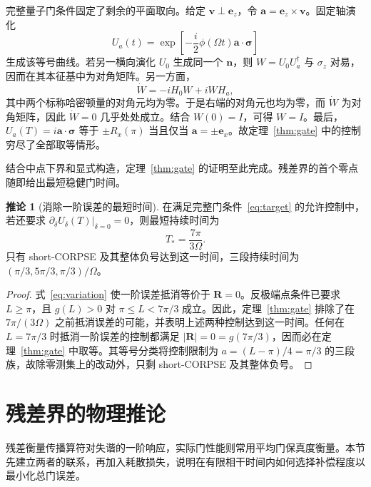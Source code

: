 \documentclass[12pt]{iopjournal}
\theoremstyle{definition}
\newtheorem{corollary}{推论}
\newcommand{\nvec}{\mathbf n}
\newcommand{\Rvec}{\mathbf R}
\newcommand{\vvec}{\mathbf v}
\newcommand{\ez}{\mathbf e_z}
\newcommand{\sigmavec}{\boldsymbol\sigma}
\begin{document}
完整量子门条件固定了剩余的平面取向。给定 $\vvec\perp\ez$，令 $\mathbf a=\ez\times\vvec$。固定轴演化
\begin{equation*}
 U_a(t)=\exp\left[-\frac{i}{2}\phi(\Omega t)
                  \mathbf a\cdot\sigmavec\right]
\end{equation*}
生成该等号曲线。若另一横向演化 $U_0$ 生成同一个 $\nvec$，则 $W=U_0U_a^\dagger$ 与 $\sigma_z$ 对易，因而在其本征基中为对角矩阵。另一方面，
\begin{equation}
 \dot W=-iH_0W+iWH_a,
 \label{eq:lift-uniqueness}
\end{equation}
其中两个标称哈密顿量的对角元均为零。于是右端的对角元也均为零，而 $\dot W$ 为对角矩阵，因此 $\dot W=0$ 几乎处处成立。结合 $W(0)=I$，可得 $W=I$。最后，$U_a(T)=i\mathbf a\cdot\sigmavec$ 等于 $\pm R_x(\pi)$ 当且仅当 $\mathbf a=\pm\mathbf e_x$。故定理~\ref{thm:gate} 中的控制穷尽了全部取等情形。

结合中点下界和显式构造，定理~\ref{thm:gate} 的证明至此完成。残差界的首个零点随即给出最短稳健门时间。

\begin{corollary}[消除一阶误差的最短时间]
\label{cor:robust-time}
在满足完整门条件~\eqref{eq:target} 的允许控制中，若还要求 $\left.\partial_\delta U_\delta(T)\right|_{\delta=0}=0$，则最短持续时间为
\begin{equation}
 T_* = \frac{7\pi}{3\Omega}.
 \label{eq:robust-time}
\end{equation}
只有 short-CORPSE 及其整体负号达到这一时间，三段持续时间为 $(\pi/3,5\pi/3,\pi/3)/\Omega$。
\end{corollary}

\begin{proof}
式~\eqref{eq:variation} 使一阶误差抵消等价于 $\Rvec=0$。反极端点条件已要求 $L\ge\pi$，且 $g(L)>0$ 对 $\pi\le L<7\pi/3$ 成立。因此，定理~\ref{thm:gate} 排除了在 $7\pi/(3\Omega)$ 之前抵消误差的可能，并表明上述两种控制达到这一时间。任何在 $L=7\pi/3$ 时抵消一阶误差的控制都满足 $|\Rvec|=0=g(7\pi/3)$，因而必在定理~\ref{thm:gate} 中取等。其等号分类将控制限制为 $a=(L-\pi)/4=\pi/3$ 的三段族，故除零测集上的改动外，只剩 short-CORPSE 及其整体负号。
\end{proof}

\section{残差界的物理推论}
\label{sec:dissipation}

残差衡量传播算符对失谐的一阶响应，实际门性能则常用平均门保真度衡量。本节先建立两者的联系，再加入耗散损失，说明在有限相干时间内如何选择补偿程度以最小化总门误差。
\end{document}
